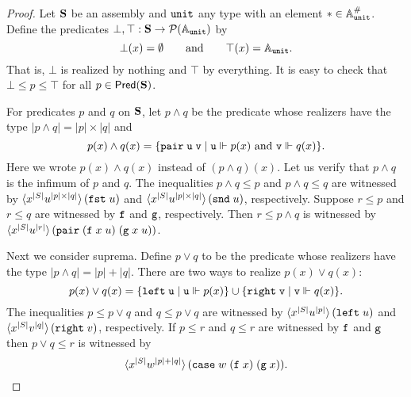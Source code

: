 \begin{proof}
  Let $\mathbf{S}$ be an assembly and $\mathtt{unit}$ any type with an element
  ${*} \in \mathbb{A}^{\#}_{\mathtt{unit}}$. Define the predicates $\bot, \top :
  \mathbf{S} \to \mathcal{P}(\mathbb{A}_{\mathtt{unit}})$ by
  \begin{equation*}
    \bot(x) = \emptyset
    \qquad\text{and}\qquad
    \top(x) = \mathbb{A}_{\mathtt{unit}}.
  \end{equation*}
  That is, $\bot$ is realized by nothing and $\top$ by everything. It is
  easy to check that $\bot \leq p \leq \top$ for all $p \in
  \mathsf{Pred}(\mathbf{S})$.

  For predicates $p$ and $q$ on $\mathbf{S}$, let $p \land q$ be the
  predicate whose realizers have the type $|p \land q| = |p| \times
  |q|$ and
  \begin{equation*}
    p(x) \land q(x) = \{\mathtt{pair}\;\mathtt{u}\;\mathtt{v} \mid
    \text{$\mathtt{u} \Vdash p(x)$ and $\mathtt{v} \Vdash q(x)$}\}.
  \end{equation*}
  Here we wrote $p(x) \land q(x)$ instead of $(p \land q)(x)$. Let us
  verify that $p \land q$ is the infimum of $p$ and $q$. The
  inequalities $p \land q \leq p$ and $p \land q \leq q$ are witnessed
  by $\langle x^{|S|} u^{|p| \times |q|} \rangle\,(\mathtt{fst}\;u)$
  and $\langle x^{|S|} u^{|p| \times
      |q|} \rangle\,(\mathtt{snd}\;u)$, respectively. Suppose $r \leq p$ and $r
  \leq q$ are witnessed by $\mathtt{f}$ and $\mathtt{g}$, respectively. Then $r
  \leq p \land q$ is witnessed by $\langle x^{|S|}
    u^{|r|} \rangle\,(\mathtt{pair}\; (\mathtt{f}\;x\;u)\; (\mathtt{g}\;x\;u))$.

  Next we consider suprema. Define $p \lor q$ to be the predicate
  whose realizers have the type $|p \land q| = |p| + |q|$. There are
  two ways to realize $p(x) \lor q(x)$:
  \begin{equation*}
    p(x) \lor q(x) =
    \{\mathtt{left}\;\mathtt{u} \mid \mathtt{u} \Vdash p(x)\} \cup
    \{\mathtt{right}\;\mathtt{v} \mid \mathtt{v} \Vdash q(x)\}.
  \end{equation*}
  The inequalities $p \leq p \lor q$ and $q \leq p \lor q$ are
  witnessed by $\langle x^{|S|} u^{|p|} \rangle\,(\mathtt{left}\;u)$
  and $\langle x^{|S|} v^{|q|} \rangle\,(\mathtt{right}\;v)$,
  respectively. If $p \leq r$ and $q \leq r$ are witnessed by $\mathtt{f}$
  and $\mathtt{g}$ then $p \lor q \leq r$ is witnessed by
  \begin{equation*}
    \langle x^{|S|} w^{|p|+|q|} \rangle\,(
      \mathtt{case}\;w\;(\mathtt{f}\;x)\;(\mathtt{g}\;x)
    ).
  \end{equation*}
  

\end{proof}
